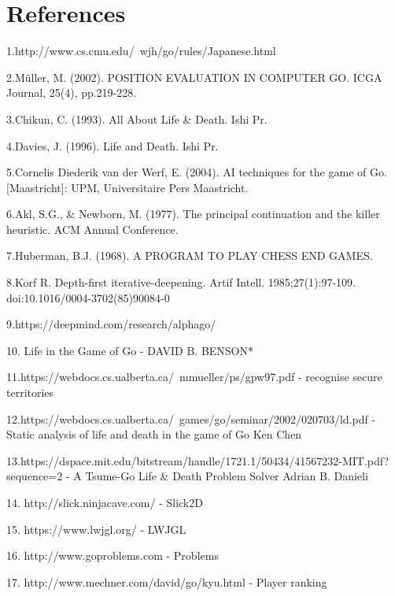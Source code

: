 \documentclass{l4proj}
\begin{document}
\chapter{References}

1.http://www.cs.cmu.edu/~wjh/go/rules/Japanese.html

2.Müller, M. (2002). POSITION EVALUATION IN COMPUTER GO. ICGA Journal, 25(4), pp.219-228.

3.Chikun, C. (1993). All About Life \& Death. Ishi Pr.

4.Davies, J. (1996). Life and Death. Ishi Pr.

5.Cornelis Diederik van der Werf, E. (2004). AI techniques for the game of Go. [Maastricht]: UPM, Universitaire Pers Maastricht.

6.Akl, S.G., \& Newborn, M. (1977). The principal continuation and the killer heuristic. ACM Annual Conference.

7.Huberman, B.J. (1968). A PROGRAM TO PLAY CHESS END GAMES.

8.Korf R. Depth-first iterative-deepening. Artif Intell. 1985;27(1):97-109. doi:10.1016/0004-3702(85)90084-0

9.https://deepmind.com/research/alphago/

10. Life in the Game of Go  - DAVID B. BENSON*

11.https://webdocs.cs.ualberta.ca/~mmueller/ps/gpw97.pdf  - recognise secure territories

12.https://webdocs.cs.ualberta.ca/~games/go/seminar/2002/020703/ld.pdf -  Static analysis of life and death in the game of Go Ken Chen

13.https://dspace.mit.edu/bitstream/handle/1721.1/50434/41567232-MIT.pdf?sequence=2 -
 A Tsume-Go Life \& Death Problem Solver Adrian B. Danieli

14. http://slick.ninjacave.com/ - Slick2D

15. https://www.lwjgl.org/ - LWJGL

16. http://www.goproblems.com - Problems

17. http://www.mechner.com/david/go/kyu.html - Player ranking


\end{document}
